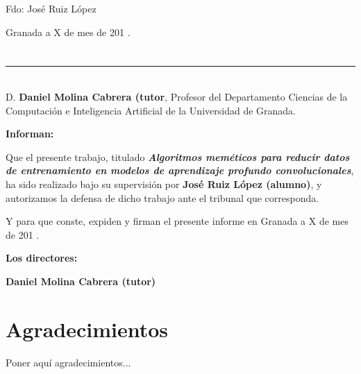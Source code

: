 \vspace{6cm}

\noindent Fdo: José Ruiz López

\vspace{2cm}

\begin{flushright}
       Granada a X de mes de 201 .
\end{flushright}


\chapter*{}
\thispagestyle{empty}

\noindent\rule[-1ex]{\textwidth}{2pt}\\[4.5ex]

D. \textbf{Daniel Molina Cabrera (tutor}, Profesor del Departamento Ciencias de la Computación e Inteligencia
Artificial de la Universidad de Granada.

\vspace{0.5cm}

\textbf{Informan:}

\vspace{0.5cm}

Que el presente trabajo, titulado \textit{\textbf{Algoritmos meméticos para reducir datos de entrenamiento en modelos
              de aprendizaje profundo convolucionales}},
ha sido realizado bajo su supervisión por \textbf{José Ruiz López (alumno)}, y autorizamos la defensa de dicho trabajo
ante el tribunal que corresponda.

\vspace{0.5cm}

Y para que conste, expiden y firman el presente informe en Granada a X de mes de 201 .

\vspace{1cm}

\textbf{Los directores:}

\vspace{5cm}

\noindent \textbf{Daniel Molina Cabrera (tutor)}

\chapter*{Agradecimientos}
\thispagestyle{empty}

\vspace{1cm}


Poner aquí agradecimientos...

